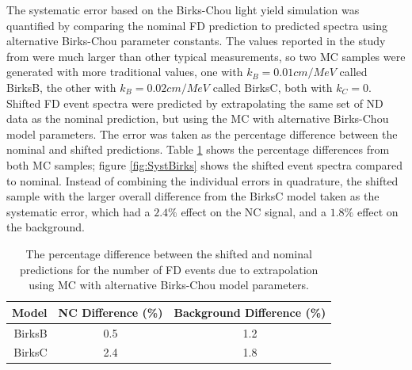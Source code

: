 The systematic error based on the Birks-Chou light yield simulation was quantified by comparing the nominal FD prediction to predicted spectra using alternative Birks-Chou parameter constants. The values reported in the study from \cite{ref:DanBirks} were much larger than other typical measurements, so two MC samples were generated with more traditional values, one with $k_B = 0.01\unit{cm/MeV}$ called BirksB, the other with $k_B = 0.02\unit{cm/MeV}$ called BirksC, both with $k_C = 0$. Shifted FD event spectra were predicted by extrapolating the same set of ND data as the nominal prediction, but using the MC with alternative Birks-Chou model parameters. The error was taken as the percentage difference between the nominal and shifted predictions. Table \ref{tab:SystBirks} shows the percentage differences from both MC samples; figure \ref{fig:SystBirks} shows the shifted event spectra compared to nominal. Instead of combining the individual errors in quadrature, the shifted sample with the larger overall difference from the BirksC model taken as the systematic error, which had a $2.4\%$ effect on the NC signal, and a $1.8\%$ effect on the background.
\begin{table}[htb]
  \begin{center}
    \caption[Birks-Chou Systematic Errors]{The percentage difference between the shifted and nominal predictions for the number of FD events due to extrapolation using MC with alternative Birks-Chou model parameters.}
    \label{tab:SystBirks}
    \begin{tabular}{r c c}
      \hline\hline
      Model & NC Difference (\%) & Background Difference (\%) \\
      \hline
      BirksB & 0.5 & 1.2 \\
      BirksC & 2.4 & 1.8 \\
      \hline
    \end{tabular}
  \end{center}
\end{table}

